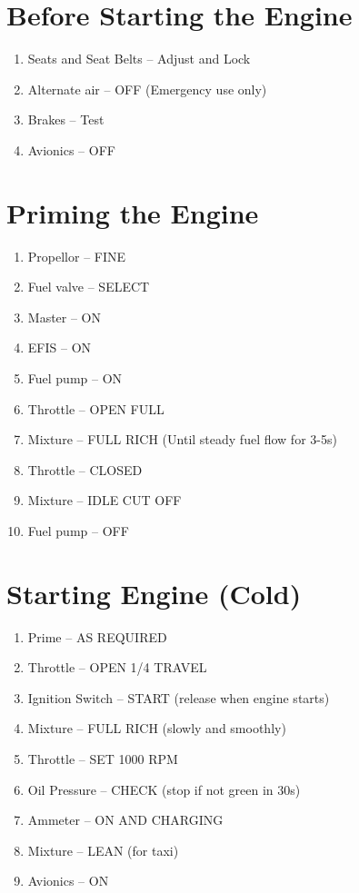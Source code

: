 \section{Before Starting the Engine}
\begin{enumerate}[(1)]
  \item Seats and Seat Belts -- Adjust and Lock
  \item Alternate air -- OFF (Emergency use only)
  \item Brakes -- Test
  \item Avionics -- OFF
\end{enumerate}

\section{Priming the Engine}
\begin{enumerate}[(1)]
  \item Propellor -- FINE
  \item Fuel valve -- SELECT
  \item Master -- ON
  \item EFIS -- ON
  \item Fuel pump -- ON
  \item Throttle -- OPEN FULL
  \item Mixture -- FULL RICH (Until steady fuel flow for 3-5s)
  \item Throttle -- CLOSED
  \item Mixture -- IDLE CUT OFF
  \item Fuel pump -- OFF
\end{enumerate}

\section{Starting Engine (Cold)}
\begin{enumerate}[(1)]
  \item Prime -- AS REQUIRED
  \item Throttle -- OPEN 1/4 TRAVEL
  \item Ignition Switch -- START (release when engine starts)
  \item Mixture -- FULL RICH (slowly and smoothly)
  \item Throttle -- SET 1000 RPM
  \item Oil Pressure -- CHECK (stop if not green in 30s)
  \item Ammeter -- ON AND CHARGING
  \item Mixture -- LEAN (for taxi)
  \item Avionics -- ON 
\end{enumerate}

